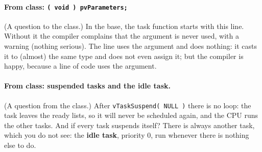 \paragraph{From class: \texttt{( void ) pvParameters;}} (A question to the class.) In the base, the task function starts with this line. Without it the compiler complains that the argument is never used, with a warning (nothing serious). The line uses the argument and does nothing: it casts it to (almost) the same type and does not even assign it; but the compiler is happy, because a line of code uses the argument.

\paragraph{From class: suspended tasks and the idle task.} (A question from the class.) After \texttt{vTaskSuspend( NULL )} there is no loop: the task leaves the ready lists, so it will never be scheduled again, and the CPU runs the other tasks. And if every task suspends itself? There is always another task, which you do not see: the \textbf{idle task}, priority 0, run whenever there is nothing else to do.

